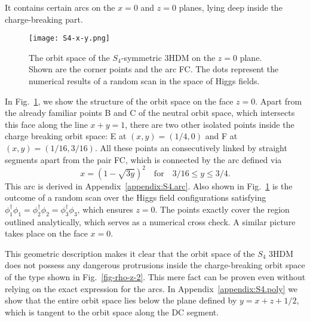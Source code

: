 \documentclass[11pt]{article}
\begin{document}
\begin{itemize}
It contains certain arcs on the $x = 0$ and $z = 0$ planes, lying deep inside the charge-breaking part.
\begin{figure} [h]
	\centering
	\texttt{[image: S4-x-y.png]}
	\caption{The orbit space of the $S_4$-symmetric 3HDM on the $z=0$ plane. 
		Shown are the corner points and the arc FC. The dots represent the numerical results of a random scan in the space of Higgs fields.}
	\label{fig-S4-x-y}
\end{figure}
In Fig.~\ref{fig-S4-x-y}, we show the structure of the orbit space on the face $z=0$.
Apart from the already familiar points B and C of the neutral orbit space, which intersects this
face along the line $x+y=1$, there are two other isolated points
inside the charge breaking orbit space: E at $(x,y) = (1/4, 0)$ and F at $(x,y) = (1/16, 3/16)$. 
All these points an consecutively linked by straight segments apart from the pair FC, which
is connected by the arc defined via
\begin{equation}
x = (1-\sqrt{3y})^2 \quad \mbox{for} \quad 3/16 \le y \le 3/4.\label{S4-arc}   
\end{equation}
This arc is derived in Appendix~\ref{appendix:S4.arc}.
Also shown in Fig.~\ref{fig-S4-x-y} is the outcome of a random scan over the Higgs field configurations 
satisfying $\phi_1^\dagger\phi_1 = \phi_2^\dagger\phi_2 = \phi_3^\dagger\phi_3$,
which ensures $z=0$. The points exactly cover the region outlined analytically, which serves as a numerical cross check. 
A similar picture takes place on the face $x=0$.
\end{itemize}

This geometric description makes it clear that the orbit space of the $S_4$ 3HDM 
does not possess any dangerous protrusions inside the charge-breaking orbit space
of the type shown in Fig.~\ref{fig-rho-z-2}.
This mere fact can be proven even without relying on the exact expression for the arcs.
In Appendix~\ref{appendix:S4.poly} we show that the entire orbit space
lies below the plane defined by $y = x+z+1/2$, which is tangent to the orbit space along the DC segment.
\end{document}
